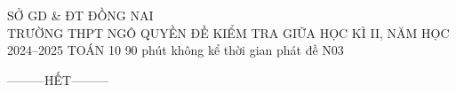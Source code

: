 \ExamInfo
    {SỞ GD \& ĐT ĐỒNG NAI\\TRƯỜNG THPT NGÔ QUYỀN}
    {ĐỀ KIỂM TRA GIỮA HỌC KÌ II, NĂM HỌC 2024--2025}
    {TOÁN 10}
    {90 phút}
    {không kể thời gian phát đề}
    {N03}

\MakeExamHeader






\begin{center}
---------HẾT---------
\end{center}
